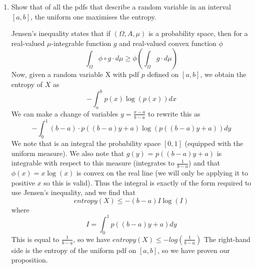 \documentclass{article}
\newcommand{\chapternumber}{2}
\newenvironment{QandA}{\begin{enumerate}[label=\chapternumber.\arabic*]\bfseries\boldmath}
	{\end{enumerate}}
\newenvironment{answered}{\par\bigskip\normalfont\unboldmath}{}
\begin{document}
\begin{QandA}
\begin{answered}
	\end{answered}

	\item Show that of all the pdfs that describe a random variable in an interval $[a,b]$, the uniform one maximises the entropy.
	\begin{answered}
		Jensen's inequality states that if $(\Omega,A,\mu)$ is a probability space, then for a real-valued $\mu$-integrable function $g$ and real-valued convex function $\phi$
		\[\int_\Omega\phi\circ g\cdot d\mu\geq\phi\left(\int_\Omega g\cdot d\mu\right)\]
		Now, given a random variable X with pdf $p$ defined on $[a,b]$, we obtain the entropy of $X$ as
		\[-\int_a^bp(x)\log(p(x))dx\]
		We can make a change of variables $y=\frac{x-a}{b-a}$ to rewrite this as
		\[-\int_0^1(b-a)\cdot p((b-a)y+a)\log(p((b-a)y+a))dy\]
		We note that is an integral the probability space $[0,1]$ (equipped with the uniform measure). We also note that $g(y)$ = $p((b-a)y+a)$ is integrable with respect to this measure (integrates to $\frac{1}{b-a}$) and that $\phi(x)=x\log(x)$ is convex on the real line (we will only be applying it to positive $x$ so this is valid). Thus the integral is exactly of the form required to use Jensen's inequality, and we find that
		\[entropy(X)\leq-(b-a)I\log(I)\]
		where
		\[I=\int_0^1p((b-a)y+a)dy\]
		This is equal to $\frac{1}{b-a}$, so we have
		$entropy(X)\leq -log(\frac{1}{b-a})$
		The right-hand side is the entropy of the uniform pdf on $[a,b]$, so we have proven our proposition.
	\end{answered}
	
	\end{QandA}
\end{document}
